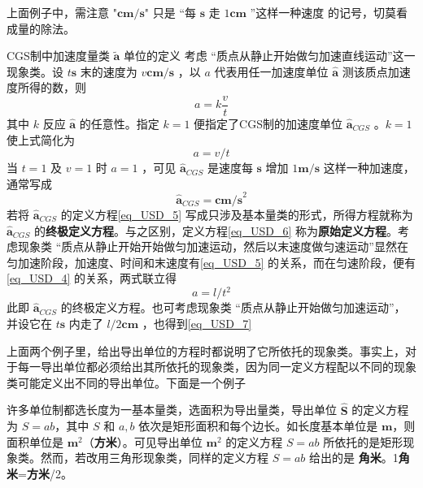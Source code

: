 上面例子中，需注意 "$\boldsymbol{cm/s}$" 只是 “每 $\boldsymbol{s}$ 走 $1\boldsymbol{cm}$ ”这样一种速度 的记号，切莫看成量的除法。
\begin{example}{CGS制中加速度量类 $\tilde{\boldsymbol{a}}$ 单位的定义}\label{ex_USD_2}
考虑 “质点从静止开始做匀加速直线运动”这一现象类。设 $t\boldsymbol{s}$ 末的速度为 $v\boldsymbol{cm/s}$ ，以 $a$ 代表用任一加速度单位 $\hat{\boldsymbol{a}}$ 测该质点加速度所得的数，则
\begin{equation}\label{eq_USD_6}
a=k\frac{v}{t}
\end{equation}
其中 $k$ 反应 $\hat{\boldsymbol{a}}$ 的任意性。指定 $k=1$ 便指定了CGS制的加速度单位 $\hat{\boldsymbol{a}}_{CGS}$ 。$k=1$ 使上式简化为
\begin{equation}\label{eq_USD_5}
a=v/t
\end{equation}
当 $t=1$ 及 $v=1$ 时 $a=1$ ，可见 $\hat{\boldsymbol{a}}_{CGS}$ 是速度每 $\boldsymbol{s}$ 增加 $1\boldsymbol{m/s}$ 这样一种加速度，通常写成
\begin{equation}
\hat{\boldsymbol{a}}_{CGS}=\boldsymbol{cm/s}^2
\end{equation}
若将 $\hat{\boldsymbol{a}}_{CGS}$ 的定义方程\autoref{eq_USD_5} 写成只涉及基本量类的形式，所得方程就称为  $\hat{\boldsymbol{a}}_{CGS}$ 的\textbf{终极定义方程}。与之区别，定义方程\autoref{eq_USD_6} 称为\textbf{原始定义方程}。考虑现象类 “质点从静止开始开始做匀加速运动，然后以末速度做匀速运动”显然在匀加速阶段，加速度、时间和末速度有\autoref{eq_USD_5} 的关系，而在匀速阶段，便有\autoref{eq_USD_4} 的关系，两式联立得
\begin{equation}\label{eq_USD_7}
a=l/t^2
\end{equation}
此即 $\hat{\boldsymbol{a}}_{CGS}$ 的终极定义方程。也可考虑现象类 “质点从静止开始做匀加速运动”，并设它在 $t\boldsymbol{s}$ 内走了 $l/2\boldsymbol{cm}$ ，也得到\autoref{eq_USD_7} 
\end{example}
上面两个例子里，给出导出单位的方程时都说明了它所依托的现象类。事实上，对于每一导出单位都必须给出其所依托的现象类，因为同一定义方程配以不同的现象类可能定义出不同的导出单位。下面是一个例子
\begin{example}{}
许多单位制都选长度为一基本量类，选面积为导出量类，导出单位 $\hat{\boldsymbol{S}}$ 的定义方程为 $S=ab$，其中 $S$ 和 $a,b$ 依次是矩形面积和每个边长。如长度基本单位是 $\boldsymbol{m}$，则面积单位是 $\boldsymbol{m}^2$（\textbf{方米}）。可见导出单位 $\boldsymbol{m}^2$ 的定义方程 $S=ab$ 所依托的是矩形现象类。然而，若改用三角形现象类，同样的定义方程 $S=ab$ 给出的是 \textbf{角米}。1\textbf{角米}=\textbf{方米}/2。
\end{example}
